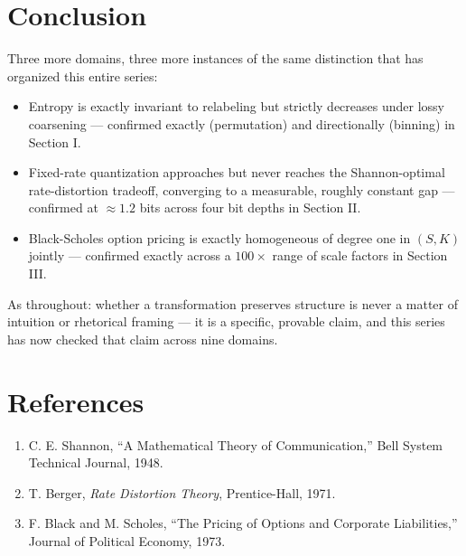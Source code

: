 \documentclass[10pt,journal,compsoc]{IEEEtran}
\begin{document}
\section{Conclusion}
Three more domains, three more instances of the same distinction that has organized this entire series:
\begin{itemize}
    \item Entropy is exactly invariant to relabeling but strictly decreases under lossy coarsening — confirmed exactly (permutation) and directionally (binning) in Section I.
    \item Fixed-rate quantization approaches but never reaches the Shannon-optimal rate-distortion tradeoff, converging to a measurable, roughly constant gap — confirmed at $\approx\!1.2$ bits across four bit depths in Section II.
    \item Black-Scholes option pricing is exactly homogeneous of degree one in $(S,K)$ jointly — confirmed exactly across a $100\times$ range of scale factors in Section III.
\end{itemize}
As throughout: whether a transformation preserves structure is never a matter of intuition or rhetorical framing — it is a specific, provable claim, and this series has now checked that claim across nine domains.

\section*{References}
\begin{small}
\begin{enumerate}
    \item C. E. Shannon, ``A Mathematical Theory of Communication,'' Bell System Technical Journal, 1948.
    \item T. Berger, \textit{Rate Distortion Theory}, Prentice-Hall, 1971.
    \item F. Black and M. Scholes, ``The Pricing of Options and Corporate Liabilities,'' Journal of Political Economy, 1973.
\end{enumerate}
\end{small}
\end{document}
